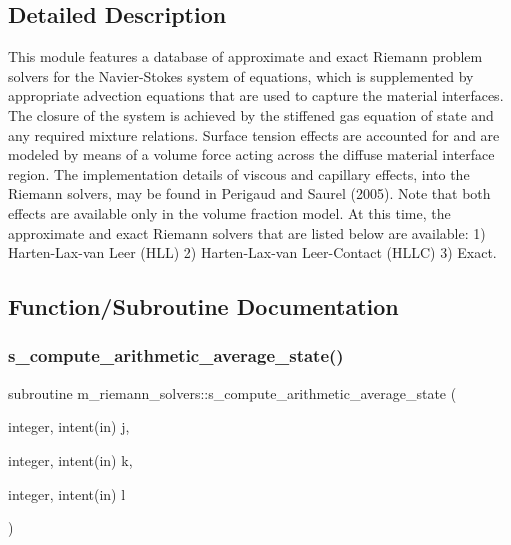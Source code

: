 \subsection{Detailed Description}
This module features a database of approximate and exact Riemann problem solvers for the Navier-\/\+Stokes system of equations, which is supplemented by appropriate advection equations that are used to capture the material interfaces. The closure of the system is achieved by the stiffened gas equation of state and any required mixture relations. Surface tension effects are accounted for and are modeled by means of a volume force acting across the diffuse material interface region. The implementation details of viscous and capillary effects, into the Riemann solvers, may be found in Perigaud and Saurel (2005). Note that both effects are available only in the volume fraction model. At this time, the approximate and exact Riemann solvers that are listed below are available\+: 1) Harten-\/\+Lax-\/van Leer (H\+LL) 2) Harten-\/\+Lax-\/van Leer-\/\+Contact (H\+L\+LC) 3) Exact. 

\subsection{Function/\+Subroutine Documentation}
\mbox{\label{namespacem__riemann__solvers_a14b6f4fa2f3b1d567a3f3347105ce61e}} 
\subsubsection{\texorpdfstring{s\+\_\+compute\+\_\+arithmetic\+\_\+average\+\_\+state()}{s\_compute\_arithmetic\_average\_state()}}
{\footnotesize\ttfamily subroutine m\+\_\+riemann\+\_\+solvers\+::s\+\_\+compute\+\_\+arithmetic\+\_\+average\+\_\+state (\begin{DoxyParamCaption}\item[{integer, intent(in)}]{j,  }\item[{integer, intent(in)}]{k,  }\item[{integer, intent(in)}]{l }\end{DoxyParamCaption})}



